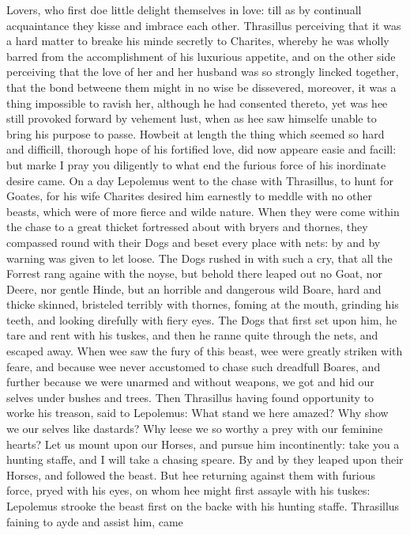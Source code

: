 Lovers, who first doe little delight themselves in love: till as by continuall
acquaintance they kisse and imbrace each other. Thrasillus perceiving that it
was a hard matter to breake his minde secretly to Charites, whereby he was
wholly barred from the accomplishment of his luxurious appetite, and on the
other side perceiving that the love of her and her husband was so strongly
lincked together, that the bond betweene them might in no wise be dissevered,
moreover, it was a thing impossible to ravish her, although he had consented
thereto, yet was hee still provoked forward by vehement lust, when as hee saw
himselfe unable to bring his purpose to passe. Howbeit at length the thing
which seemed so hard and difficill, thorough hope of his fortified love, did
now appeare easie and facill: but marke I pray you diligently to what end the
furious force of his inordinate desire came. On a day Lepolemus went to the
chase with Thrasillus, to hunt for Goates, for his wife Charites desired him
earnestly to meddle with no other beasts, which were of more fierce and wilde
nature. When they were come within the chase to a great thicket fortressed
about with bryers and thornes, they compassed round with their Dogs and beset
every place with nets: by and by warning was given to let loose. The Dogs
rushed in with such a cry, that all the Forrest rang againe with the noyse, but
behold there leaped out no Goat, nor Deere, nor gentle Hinde, but an horrible
and dangerous wild Boare, hard and thicke skinned, bristeled terribly with
thornes, foming at the mouth, grinding his teeth, and looking direfully with
fiery eyes. The Dogs that first set upon him, he tare and rent with his tuskes,
and then he ranne quite through the nets, and escaped away. When wee saw the
fury of this beast, wee were greatly striken with feare, and because wee never
accustomed to chase such dreadfull Boares, and further because we were unarmed
and without weapons, we got and hid our selves under bushes and trees. Then
Thrasillus having found opportunity to worke his treason, said to Lepolemus:
What stand we here amazed? Why show we our selves like dastards? Why leese we
so worthy a prey with our feminine hearts? Let us mount upon our Horses, and
pursue him incontinently: take you a hunting staffe, and I will take a chasing
speare. By and by they leaped upon their Horses, and followed the beast. But
hee returning against them with furious force, pryed with his eyes, on whom hee
might first assayle with his tuskes: Lepolemus strooke the beast first on the
backe with his hunting staffe. Thrasillus faining to ayde and assist him, came
